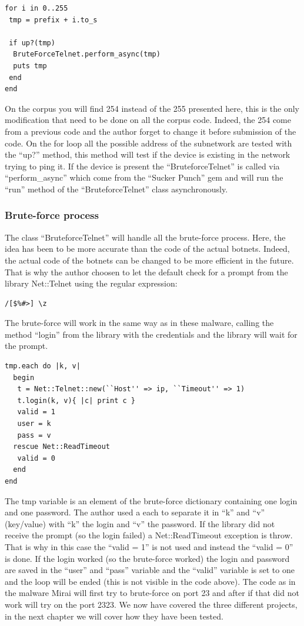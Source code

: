 \documentclass{report}
\begin{document}
\lstset{language=Ruby}
\begin{lstlisting}[frame=single]
for i in 0..255
 tmp = prefix + i.to_s

 if up?(tmp)
  BruteForceTelnet.perform_async(tmp)
  puts tmp
 end
end
\end{lstlisting}
On the corpus you will find 254 instead of the 255 presented here, this is the only modification that need to be done on all the corpus code. Indeed, the 254 come from a previous code and the author forget to change it before submission of the code.\newline
On the for loop all the possible address of the subnetwork are tested with the ``up?'' method, this method will test if the device is existing in the network trying to ping it. If the device is present the ``BruteforceTelnet'' is called via ``perform\_async'' which come from the ``Sucker Punch'' \autocite{suckerpunch} gem and will run the ``run'' method of the ``BruteforceTelnet'' class asynchronously.

\subsubsection{Brute-force process}
The class ``BruteforceTelnet'' will handle all the brute-force process. Here, the idea has been to be more accurate than the code of the actual botnets. Indeed, the actual code of the botnets can be changed to be more efficient in the future. That is why the author choosen to let the default check for a prompt from the library Net::Telnet \autocite{nettelnet} using the regular expression:
\begin{Verbatim}[frame=single]
/[$%#>] \z
\end{Verbatim}
The brute-force will work in the same way as in these malware, calling the method ``login'' from the library with the credentials and the library will wait for the prompt.
\lstset{language=Ruby}
\begin{lstlisting}[frame=single]
tmp.each do |k, v|
  begin
   t = Net::Telnet::new(``Host'' => ip, ``Timeout'' => 1)
   t.login(k, v){ |c| print c }
   valid = 1
   user = k
   pass = v
  rescue Net::ReadTimeout
   valid = 0
  end
end
\end{lstlisting}
The tmp variable is an element of the brute-force dictionary containing one login and one password. The author used a each to separate it in ``k'' and ``v'' (key/value) with ``k'' the login and ``v'' the password. If the library did not receive the prompt (so the login failed) a Net::ReadTimeout exception is throw. That is why in this case the ``valid = 1'' is not used and instead the ``valid = 0'' is done. If the login worked (so the brute-force worked) the login and password are saved in the ``user'' and ``pass'' variable and the ``valid'' variable is set to one and the loop will be ended (this is not visible in the code above).\newline
The code as in the malware Mirai will first try to brute-force on port 23 and after if that did not work will try on the port 2323.\newline
\newline
We now have covered the three different projects, in the next chapter we will cover how they have been tested.
\end{document}
